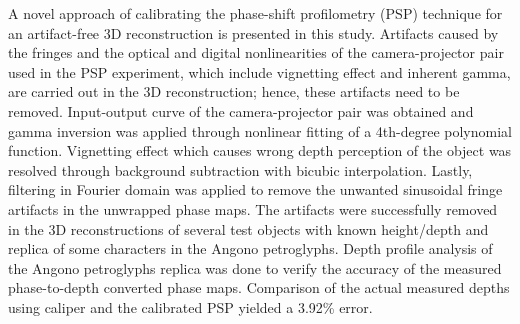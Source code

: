 A novel approach of calibrating the phase-shift profilometry (PSP) technique for an artifact-free 3D reconstruction is presented in this study. 
Artifacts caused by the fringes and the optical and digital nonlinearities of the camera-projector pair used in the PSP experiment, which include vignetting effect and inherent gamma, are carried out in the 3D reconstruction; hence, these artifacts need to be removed.  
Input-output curve of the camera-projector pair was obtained and gamma inversion was applied through nonlinear fitting of a 4th-degree polynomial function. 
Vignetting effect which causes wrong depth perception of the object was resolved through background subtraction with bicubic interpolation. 
Lastly, filtering in Fourier domain was applied to remove the unwanted sinusoidal fringe artifacts in the unwrapped phase maps. 
The artifacts were successfully removed in the 3D reconstructions of several test objects with known height/depth and replica of some characters in the Angono petroglyphs.
Depth profile analysis of the Angono petroglyphs replica was done to verify the accuracy of the measured phase-to-depth converted phase maps.
Comparison of the actual measured depths using caliper and the calibrated PSP yielded a 3.92\% error.